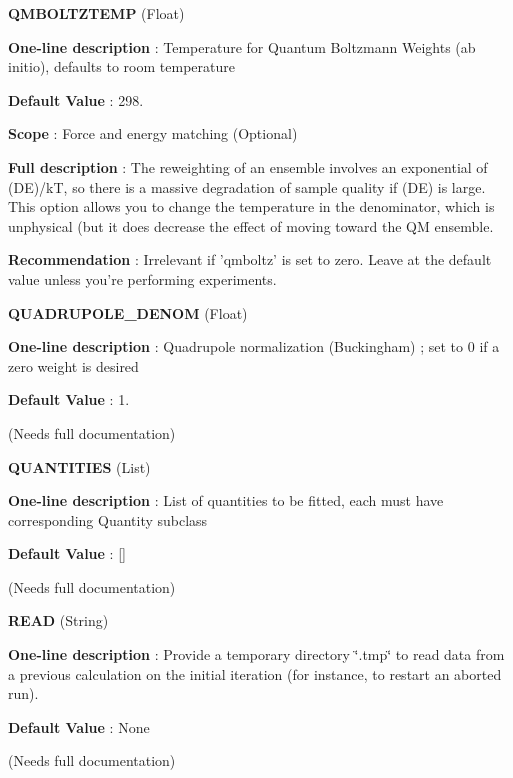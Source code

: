 \begin{DoxyItemize}
\item {\bfseries  Q\-M\-B\-O\-L\-T\-Z\-T\-E\-M\-P } (Float) \par
{\bfseries  One-\/line description }\-: Temperature for Quantum Boltzmann Weights (ab initio), defaults to room temperature \par
{\bfseries  Default Value }\-: 298. \par
{\bfseries  Scope }\-: Force and energy matching (Optional) \par
{\bfseries  Full description }\-: The reweighting of an ensemble involves an exponential of (D\-E)/k\-T, so there is a massive degradation of sample quality if (D\-E) is large. This option allows you to change the temperature in the denominator, which is unphysical (but it does decrease the effect of moving toward the Q\-M ensemble. \par
{\bfseries  Recommendation }\-: Irrelevant if 'qmboltz' is set to zero. Leave at the default value unless you're performing experiments.\end{DoxyItemize}
\begin{DoxyItemize}
\item {\bfseries  Q\-U\-A\-D\-R\-U\-P\-O\-L\-E\-\_\-\-D\-E\-N\-O\-M } (Float) \par
{\bfseries  One-\/line description }\-: Quadrupole normalization (Buckingham) ; set to 0 if a zero weight is desired \par
{\bfseries  Default Value }\-: 1. \par
(Needs full documentation)\end{DoxyItemize}
\begin{DoxyItemize}
\item {\bfseries  Q\-U\-A\-N\-T\-I\-T\-I\-E\-S } (List) \par
{\bfseries  One-\/line description }\-: List of quantities to be fitted, each must have corresponding Quantity subclass \par
{\bfseries  Default Value }\-: \mbox{[}\mbox{]} \par
(Needs full documentation)\end{DoxyItemize}
\begin{DoxyItemize}
\item {\bfseries  R\-E\-A\-D } (String) \par
{\bfseries  One-\/line description }\-: Provide a temporary directory \char`\"{}.\-tmp\char`\"{} to read data from a previous calculation on the initial iteration (for instance, to restart an aborted run). \par
{\bfseries  Default Value }\-: None \par
(Needs full documentation)\end{DoxyItemize}
